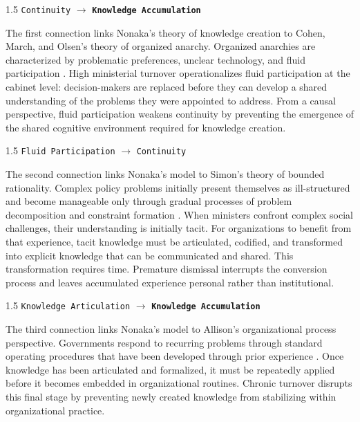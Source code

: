 \documentclass[doc, 12pt, a4paper,floatsintext]{apa7}
\begin{document}
\begin{spacing}{1.5}
\noindent
\texttt{Continuity}
$\rightarrow$
\texttt{\bf Knowledge Accumulation}
\end{spacing}

The first connection links Nonaka's theory of knowledge creation to Cohen, March, and Olsen's theory of organized anarchy. Organized anarchies are characterized by problematic preferences, unclear technology, and fluid participation \parencite{cohen_garbage_1972}. High ministerial turnover operationalizes fluid participation at the cabinet level: decision-makers are replaced before they can develop a shared understanding of the problems they were appointed to address. From a causal perspective, fluid participation weakens continuity by preventing the emergence of the shared cognitive environment required for knowledge creation.

\begin{spacing}{1.5}
\noindent
\texttt{Fluid Participation}
$\rightarrow$
\texttt{Continuity}
\end{spacing}

The second connection links Nonaka's model to Simon's theory of bounded rationality. Complex policy problems initially present themselves as ill-structured and become manageable only through gradual processes of problem decomposition and constraint formation \parencite[4--5]{foss_simon_2005}. When ministers confront complex social challenges, their understanding is initially tacit. For organizations to benefit from that experience, tacit knowledge must be articulated, codified, and transformed into explicit knowledge that can be communicated and shared. This transformation requires time. Premature dismissal interrupts the conversion process and leaves accumulated experience personal rather than institutional.

\begin{spacing}{1.5}
\noindent
\texttt{Knowledge Articulation}
$\rightarrow$
\texttt{\bf Knowledge Accumulation}
\end{spacing}

The third connection links Nonaka's model to Allison's organizational process perspective. Governments respond to recurring problems through standard operating procedures that have been developed through prior experience \parencite{allison_conceptual_1969}. Once knowledge has been articulated and formalized, it must be repeatedly applied before it becomes embedded in organizational routines. Chronic turnover disrupts this final stage by preventing newly created knowledge from stabilizing within organizational practice.
\end{document}
